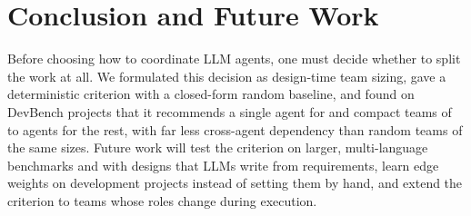 \section{Conclusion and Future Work}
\label{sec:conclusion}
Before choosing how to coordinate LLM agents, one must decide whether to split the work at all. We formulated this decision as design-time team sizing, gave a deterministic criterion with a closed-form random baseline, and found on \NProjects DevBench projects that it recommends a single agent for \NSingle and compact teams of \KMin to \KMax agents for the rest, with far less cross-agent dependency than random teams of the same sizes. \ConclusionAll{} Future work will test the criterion on larger, multi-language benchmarks and with designs that LLMs write from requirements, learn edge weights on development projects instead of setting them by hand, and extend the criterion to teams whose roles change during execution.
